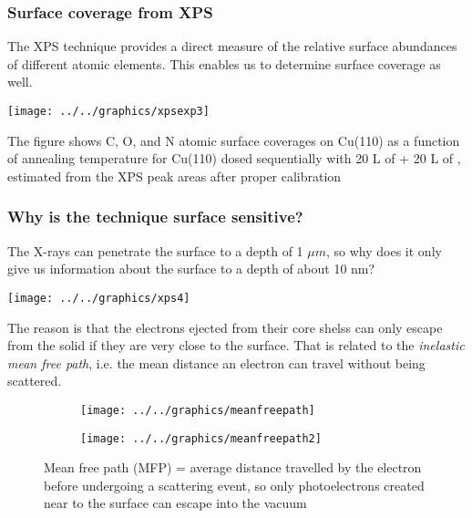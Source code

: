 \documentclass[ignorenonframetext]{beamer}
\begin{document}

\subsubsection{Surface coverage from XPS}

The XPS technique provides a direct measure of the relative surface abundances of different atomic elements. This enables us to determine surface coverage as well.

\begin{center}\texttt{[image: ../../graphics/xpsexp3]}\end{center}

The figure shows C, O, and N atomic surface coverages on Cu(110) as a function of annealing temperature for Cu(110) dosed sequentially with 20 L of  + 20 L of , estimated from the XPS peak areas after proper calibration

\subsubsection{Why is the technique surface sensitive?}

The X-rays can penetrate the surface to a depth of 1 \(\mu m\), so why does it only give us information about the surface to a depth of about 10 nm?

\begin{center}\texttt{[image: ../../graphics/xps4]}\end{center}

The reason is that the electrons ejected from their core shelss can only escape from the solid if they are very close to the surface. That is related to the \textit{inelastic mean free path}, i.e. the mean distance an electron can travel without being scattered. 

\begin{figure}[H]
\centering
\begin{subfigure}[b]{.45\textwidth}
\texttt{[image: ../../graphics/meanfreepath]}
\end{subfigure}
\begin{subfigure}[b]{.45\textwidth}
\texttt{[image: ../../graphics/meanfreepath2]}
\end{subfigure}
\caption{Mean free path (MFP)  = average distance travelled by the electron before undergoing a scattering event, so only photoelectrons created near to the surface can escape into the vacuum}
\end{figure}
\end{document}
